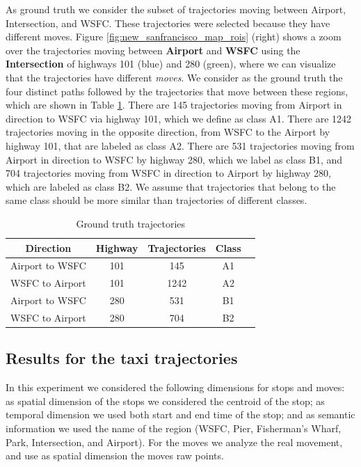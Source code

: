 As ground truth we consider the subset of trajectories moving between Airport,  Intersection, and WSFC. These trajectories were selected because they have different moves.  Figure {\ref{fig:new_sanfrancisco_map_rois}} (right) shows a zoom over the trajectories moving between  \textbf{Airport} and \textbf{WSFC}  using the \textbf{Intersection} of highways 101 (blue) and 280 (green), where we can visualize that the trajectories have different \emph{moves}. We consider as the ground truth the four distinct paths followed by the trajectories that move between these regions, which are shown in Table {\ref{tab:new_san_francisco_dataset}}. There are 145 trajectories moving from Airport in direction to WSFC via highway 101, which we define as class A1. There are 1242 trajectories moving in the opposite direction, from WSFC to the Airport by highway 101, that are labeled as class A2. There are 531 trajectories moving from Airport in direction to WSFC by highway 280, which we label as class B1, and 704 trajectories moving from WSFC in direction to Airport by highway 280, which are labeled as class B2. We assume that trajectories that belong to the same class should be more similar than trajectories of different classes.

\begin{table}[h]
\scriptsize
  \centering
  \begin{tabular}{|c|c|c|c|c|}
  \hline
 Direction & Highway & Trajectories & Class \\
  \hline
 Airport to WSFC & 101 & 145 & A1\\
 WSFC to Airport & 101 & 1242 & A2\\
 Airport to WSFC & 280 & 531 & B1\\
 WSFC to Airport & 280 & 704 & B2\\
    \hline
  \end{tabular}
  \caption{Ground truth trajectories}
  \label{tab:new_san_francisco_dataset}
\end{table}

\subsection{Results for the taxi trajectories}

In this experiment we considered the following dimensions for stops and moves: as spatial dimension of the stops we considered the centroid of the stop; as temporal dimension we used both start and end time of the stop; and as semantic information we used the name of the region (WSFC, Pier, Fisherman's Wharf, Park, Intersection, and Airport). For the moves we analyze the real movement, and use as spatial dimension the moves raw points.


